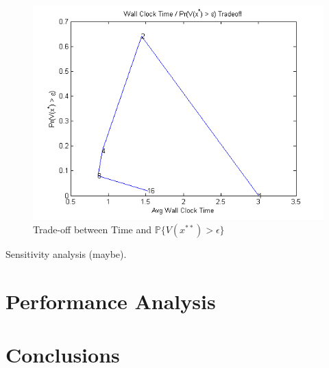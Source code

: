 \documentclass[12pt]{article}
\begin{document}
\begin{figure}[ht]
	\centering
		\includegraphics{../plot/figs/wct_probviolprobgreateps_frontier.png}
	\caption{Trade-off between Time and $\mathbb{P}\{V(x^{**}) > \epsilon \}$}
	\label{fig:fig_simplex_time}
\end{figure}


Sensitivity analysis (maybe).
\section*{Performance Analysis}

\section*{Conclusions}



%
%


 
\end{document}
